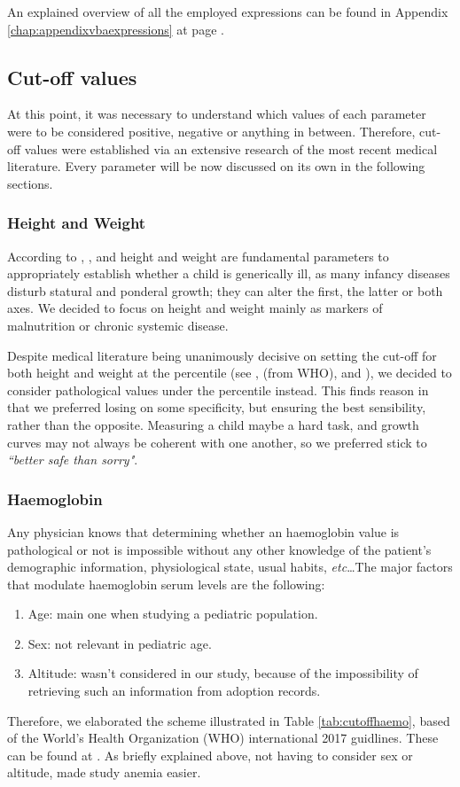 An explained overview of all the employed expressions can be found in Appendix \ref{chap:appendixvbaexpressions} at page \pageref{chap:appendixvbaexpressions}.

\subsection{Cut-off values}\label{sub:cutoffvalues}
At this point, it was necessary to understand which values of each parameter were to be considered positive, negative or anything in between. Therefore, cut-off values were established via an extensive research of the most recent medical literature. Every parameter will be now discussed on its own in the following sections.

\subsubsection{Height and Weight}\label{sub:heightandweight}
According to \cite{height1}, \cite{height4}, and \cite{height5} height and weight are fundamental parameters to appropriately establish whether a child is generically ill, as many infancy diseases disturb statural and ponderal growth; they can alter the first, the latter or both axes. We decided to focus on height and weight mainly as markers of malnutrition or chronic systemic disease.

Despite medical literature being unanimously decisive on setting the cut-off for both height and weight at the  percentile (see \cite{height1}, \cite{height2} (from WHO), and \cite{height3}), we decided to consider pathological values under the  percentile instead. This finds reason in that we preferred losing on some specificity, but ensuring the best sensibility, rather than the opposite. Measuring a child maybe a hard task, and growth curves may not always be coherent with one another, so we preferred stick to \textit{``better safe than sorry"}. 

\subsubsection{Haemoglobin}\label{sub:haemoglobin}
Any physician knows that determining whether an haemoglobin value is pathological or not is impossible without any other knowledge of the patient's demographic information, physiological state, usual habits, \textit{etc}\dots The major factors that modulate haemoglobin serum levels are the following:
\begin{enumerate}
	\item Age: main one when studying a pediatric population.
	\item Sex: not relevant in pediatric age.
	\item Altitude: wasn't considered in our study, because of the impossibility of retrieving such an information from adoption records.
\end{enumerate}
Therefore, we elaborated the scheme illustrated in Table \ref{tab:cutoffhaemo}, based of the World's Health Organization (WHO) international 2017 guidlines. These can be found at \cite{Hbcutoff}. As briefly explained above, not having to consider sex or altitude, made study anemia easier.

